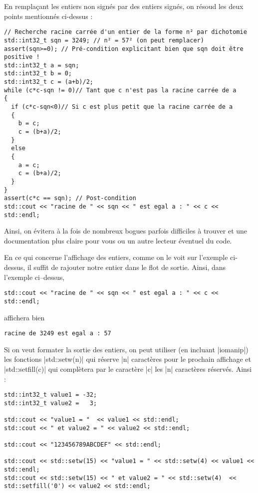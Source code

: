 En remplaçant les entiers non signés par des entiers signés, on résoud les deux points mentionnés ci-dessus :
\begin{lstlisting}[caption=Résolution problème entiers non signés avec des entiers signés]
// Recherche racine carrée d'un entier de la forme n² par dichotomie
std::int32_t sqn = 3249; // n² = 57² (on peut remplacer)
assert(sqn>=0); // Pré-condition explicitant bien que sqn doit être positive !
std::int32_t a = sqn;
std::int32_t b = 0;
std::int32_t c = (a+b)/2;
while (c*c-sqn != 0)// Tant que c n'est pas la racine carrée de a
{
  if (c*c-sqn<0)// Si c est plus petit que la racine carrée de a
  {
    b = c;
    c = (b+a)/2;
  }
  else
  {
    a = c;
    c = (b+a)/2;
  }
}
assert(c*c == sqn); // Post-condition
std::cout << "racine de " << sqn << " est egal a : " << c << std::endl;
\end{lstlisting}

Ainsi, on évitera à la fois de nombreux bogues parfois difficiles à trouver et une documentation plus claire pour
vous ou un autre lecteur éventuel du code.

En ce qui concerne l'affichage des entiers, comme on le voit sur l'exemple ci-dessus, il suffit de rajouter notre
entier dans le flot de sortie. Ainsi, dans l'exemple ci--dessus,
\begin{lstlisting}
std::cout << "racine de " << sqn << " est egal a : " << c << std::endl;
\end{lstlisting}
affichera bien
\begin{verbatim}
racine de 3249 est egal a : 57
\end{verbatim}

Si on veut formater la sortie des entiers, on peut utiliser (en incluant |iomanip|) les fonctions
|std::setw(n)| qui réserve |n| caractères pour le prochain affichage et |std::setfill(c)| qui complètera
par le caractère |c| les |n| caractères réservés. Ainsi :
\begin{lstlisting}
std::int32_t value1 = -32;
std::int32_t value2 =   3;

std::cout << "value1 = "  << value1 << std::endl;
std::cout << " et value2 = " << value2 << std::endl;

std::cout << "123456789ABCDEF" << std::endl;

std::cout << std::setw(15) << "value1 = " << std::setw(4) << value1 << std::endl;
std::cout << std::setw(15) << " et value2 = " << std::setw(4)  << std::setfill('0') << value2 << std::endl;
\end{lstlisting}

